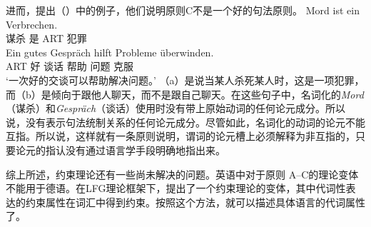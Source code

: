 进而，\citet[]{Fanselow92b}提出（）中的例子，他们说明原则C不是一个好的句法原则。
\eal
\ex 
\gll Mord ist ein Verbrechen.\\
     谋杀 是 ART 犯罪\\
\ex 
\gll Ein gutes Gespräch hilft Probleme überwinden.\\
     ART 好 谈话 帮助 问题 克服\\
\glt `一次好的交谈可以帮助解决问题。'
\zl
（a）是说当某人杀死某人时，这是一项犯罪，而（b）是倾向于跟他人聊天，而不是跟自己聊天。在这些句子中，名词化的\emph{Mord}（谋杀）和\emph{Gespräch}（谈话）使用时没有带上原始动词的任何论元成分。所以说，没有表示句法统制关系的任何论元成分。尽管如此，名词化的动词的论元不能互指。所以说，这样就有一条原则说明，谓词的论元槽上必须解释为非互指的，只要论元的指认没有通过语言学手段明确地指出来。

综上所述，约束理论还有一些尚未解决的问题。英语中对于原则 A--C的\hpsg 理论变体不能用于德语\citep[Chapter~20]{Mueller99a}。在LFG理论框架下，\citet{Dalrymple93a}提出了一个约束理论的变体，其中代词性表达的约束属性在词汇中得到约束。按照这个方法，就可以描述具体语言的代词属性了。

